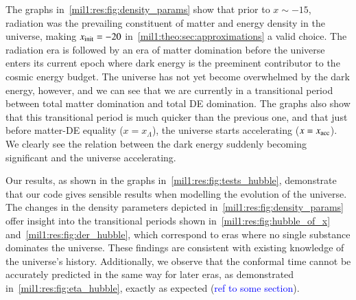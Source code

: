 

The graphs in~\cref{mil1:res:fig:density_params} show that prior to $x\sim-15$, radiation was the prevailing constituent of matter and energy density in the universe, making $x_\mathrm{init}=-20$ in~\cref{mil1:theo:sec:approximations} a valid choice. The radiation era is followed by an era of matter domination before the universe enters its current epoch where dark energy is the preeminent contributor to the cosmic energy budget. The universe has not yet become overwhelmed by the dark energy, however, and we can see that we are currently in a transitional period between total matter domination and total DE domination. The graphs also show that this transitional period is much quicker than the previous one, and that just before matter-DE equality ($x=x_{\Lambda}$), the universe starts accelerating ($x=x_\mathrm{acc}$). We clearly see the relation between the dark energy suddenly becoming significant and the universe accelerating. 

Our results, as shown in the graphs in~\cref{mil1:res:fig:tests_hubble}, demonstrate that our code gives sensible results when modelling the evolution of the universe. The changes in the density parameters depicted in~\cref{mil1:res:fig:density_params} offer insight into the transitional periods shown in~\cref{mil1:res:fig:hubble_of_x} and~\cref{mil1:res:fig:der_hubble}, which correspond to eras where no single substance dominates the universe. These findings are consistent with existing knowledge of the universe's history. Additionally, we observe that the conformal time cannot be accurately predicted in the same way for later eras, as demonstrated in~\cref{mil1:res:fig:eta_hubble}, exactly as expected (\textcolor{blue}{ref to some section}).


